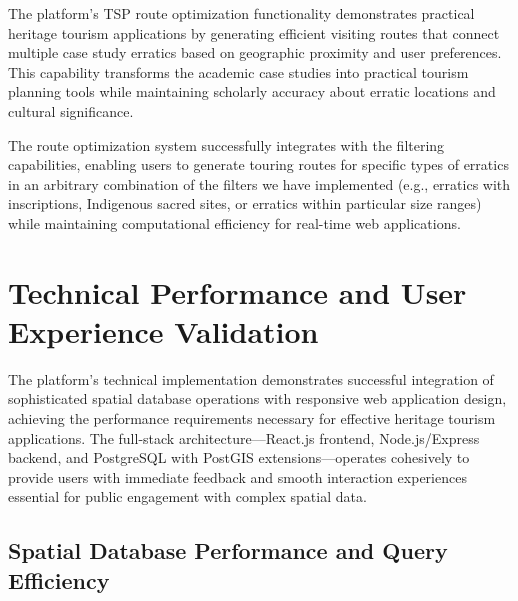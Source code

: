 The platform's TSP route optimization functionality demonstrates practical heritage tourism applications by generating efficient visiting routes that connect multiple case study erratics based on geographic proximity and user preferences. This capability transforms the academic case studies into practical tourism planning tools while maintaining scholarly accuracy about erratic locations and cultural significance.


The route optimization system successfully integrates with the filtering capabilities, enabling users to generate touring routes for specific types of erratics in an arbitrary combination of the filters we have implemented (e.g., erratics with inscriptions, Indigenous sacred sites, or erratics within particular size ranges) while maintaining computational efficiency for real-time web applications.

\section{Technical Performance and User Experience Validation}
\label{sec:technical_performance}

The platform's technical implementation demonstrates successful integration of sophisticated spatial database operations with responsive web application design, achieving the performance requirements necessary for effective heritage tourism applications. The full-stack architecture—React.js frontend, Node.js/Express backend, and PostgreSQL with PostGIS extensions—operates cohesively to provide users with immediate feedback and smooth interaction experiences essential for public engagement with complex spatial data.

\subsection{Spatial Database Performance and Query Efficiency}
\label{subsec:spatial_database_performance}


